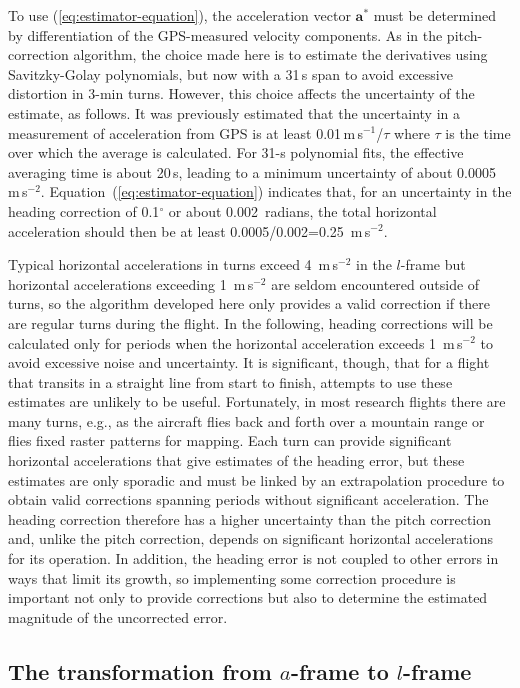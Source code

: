 \documentclass[english,british,amtd,bookmarks=false,unicode=true]{copernicus}\usepackage[]{graphicx}\usepackage[]{color}
\begin{document}
To use (\ref{eq:estimator-equation}), the acceleration vector $\mathbf{a^{*}}$
must be determined by differentiation of the GPS-measured velocity
components. As in the pitch-correction algorithm, the choice made
here is to estimate the derivatives using Savitzky-Golay polynomials,
but now with a 31\,s span to avoid excessive distortion in 3-min
turns. However, this choice affects the uncertainty of the estimate,
as follows. It was previously estimated that the uncertainty in a
measurement of acceleration from GPS is at least 0.01\,m\,s$^{-1}$/$\tau$
where $\tau$ is the time over which the average is calculated. For
31-s polynomial fits, the effective averaging time is about 20\,s,
leading to a minimum uncertainty of about 0.0005\,m\,s$^{-2}$.
Equation~(\ref{eq:estimator-equation}) indicates that, for an uncertainty
in the heading correction of 0.1$^{\circ}$ or about 0.002~radians,
the total horizontal acceleration should then be at least 0.0005/0.002=0.25~m\,s$^{-2}$.

Typical horizontal accelerations in turns exceed 4~m\,s$^{-2}$
in the $l$-frame but horizontal accelerations exceeding 1~m\,s$^{-2}$
are seldom encountered outside of turns, so the algorithm developed
here only provides a valid correction if there are regular turns during
the flight. In the following, heading corrections will be calculated
only for periods when the horizontal acceleration exceeds 1~m\,s$^{-2}$
to avoid excessive noise and uncertainty. It is significant, though,
that for a flight that transits in a straight line from start to finish,
attempts to use these estimates are unlikely to be useful. Fortunately,
in most research flights there are many turns, e.g., as the aircraft
flies back and forth over a mountain range or flies fixed raster patterns
for mapping. Each turn can provide significant horizontal accelerations
that give estimates of the heading error, but these estimates are
only sporadic and must be linked by an extrapolation procedure to
obtain valid corrections spanning periods without significant acceleration.
The heading correction therefore has a higher uncertainty than the
pitch correction and, unlike the pitch correction, depends on significant
horizontal accelerations for its operation. In addition, the heading
error is not coupled to other errors in ways that limit its growth,
so implementing some correction procedure is important not only to
provide corrections but also to determine the estimated magnitude
of the uncorrected error.


\subsection{The transformation from $a$-frame to $l$-frame}
\end{document}
